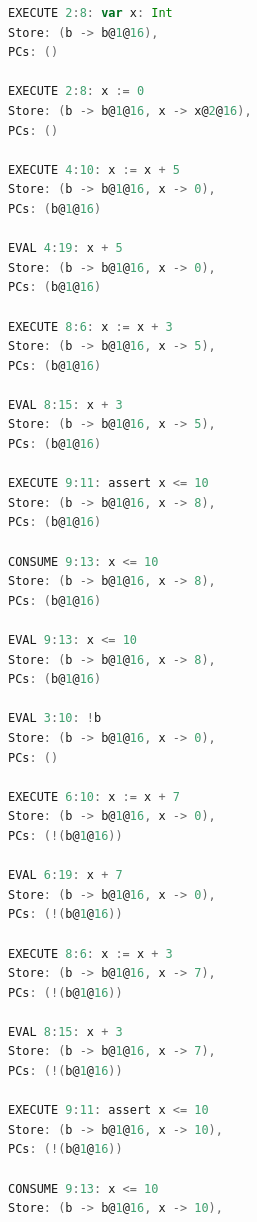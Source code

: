 \documentclass[11pt]{article}
\begin{document}
    \begin{lstlisting}[language=Scala, caption={An example Viper program.}, label={lst:viper-example}]
EXECUTE 2:8: var x: Int
Store: (b -> b@1@16),
PCs: ()

EXECUTE 2:8: x := 0
Store: (b -> b@1@16, x -> x@2@16),
PCs: ()

EXECUTE 4:10: x := x + 5
Store: (b -> b@1@16, x -> 0),
PCs: (b@1@16)

EVAL 4:19: x + 5
Store: (b -> b@1@16, x -> 0),
PCs: (b@1@16)

EXECUTE 8:6: x := x + 3
Store: (b -> b@1@16, x -> 5),
PCs: (b@1@16)

EVAL 8:15: x + 3
Store: (b -> b@1@16, x -> 5),
PCs: (b@1@16)

EXECUTE 9:11: assert x <= 10
Store: (b -> b@1@16, x -> 8),
PCs: (b@1@16)

CONSUME 9:13: x <= 10
Store: (b -> b@1@16, x -> 8),
PCs: (b@1@16)

EVAL 9:13: x <= 10
Store: (b -> b@1@16, x -> 8),
PCs: (b@1@16)

EVAL 3:10: !b
Store: (b -> b@1@16, x -> 0),
PCs: ()

EXECUTE 6:10: x := x + 7
Store: (b -> b@1@16, x -> 0),
PCs: (!(b@1@16))

EVAL 6:19: x + 7
Store: (b -> b@1@16, x -> 0),
PCs: (!(b@1@16))

EXECUTE 8:6: x := x + 3
Store: (b -> b@1@16, x -> 7),
PCs: (!(b@1@16))

EVAL 8:15: x + 3
Store: (b -> b@1@16, x -> 7),
PCs: (!(b@1@16))

EXECUTE 9:11: assert x <= 10
Store: (b -> b@1@16, x -> 10),
PCs: (!(b@1@16))

CONSUME 9:13: x <= 10
Store: (b -> b@1@16, x -> 10),
    \end{lstlisting}
\end{document}
